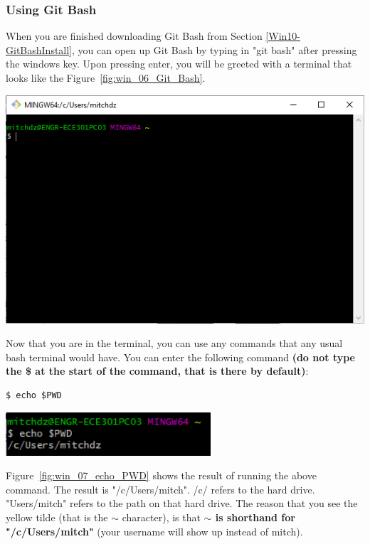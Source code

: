 \documentclass[12pt]{article}
\begin{document}
\subsubsection{Using Git Bash}
When you are finished downloading Git Bash from Section \ref{Win10-GitBashInstall}, you can open up Git Bash by typing in "git bash" after pressing the windows key. Upon pressing enter, you will be greeted with a terminal that looks like the Figure~\ref{fig:win_06_Git_Bash}.

\begin{center}
    \includegraphics[scale=0.6]{win_06_Git_Bash.PNG}
    \label{fig:win_06_Git_Bash}
\end{center}

Now that you are in the terminal, you can use any commands that any usual bash terminal would have. You can enter the following command \textbf{(do not type the \$ at the start of the command, that is there by default)}:

\begin{lstlisting}
$ echo $PWD
\end{lstlisting}

\begin{center}
    \includegraphics[width=3in]{win_07_echo_PWD.PNG}
    \label{fig:win_07_echo_PWD}
\end{center}

Figure~\ref{fig:win_07_echo_PWD} shows the result of running the above command. The result is "/c/Users/mitch". /c/ refers to the hard drive. "Users/mitch" refers to the path on that hard drive. The reason that you see the yellow tilde (that is the $\sim$ character), is that \textbf{$\sim$ is shorthand for "/c/Users/mitch"} (your username will show up instead of mitch).
\end{document}

